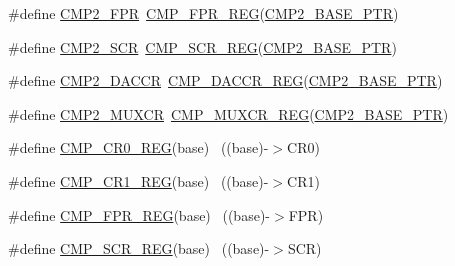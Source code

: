\begin{DoxyCompactItemize}
\item 
\#define \hyperlink{group___c_m_p___register___accessor___macros_ga9dc777b96070e089202af634a3da0feb}{C\+M\+P2\+\_\+\+F\+PR}~\hyperlink{group___c_m_p___register___accessor___macros_ga343773a1ef97ce5124a805a7e42af104}{C\+M\+P\+\_\+\+F\+P\+R\+\_\+\+R\+EG}(\hyperlink{group___c_m_p___peripheral_ga732cbf43f95d2d1cd01b4204263940ab}{C\+M\+P2\+\_\+\+B\+A\+S\+E\+\_\+\+P\+TR})
\item 
\#define \hyperlink{group___c_m_p___register___accessor___macros_ga3fecb254542d1ea6f149b0b42c31fc53}{C\+M\+P2\+\_\+\+S\+CR}~\hyperlink{group___c_m_p___register___accessor___macros_ga078b884bead12ed9b24c285c8f73fd27}{C\+M\+P\+\_\+\+S\+C\+R\+\_\+\+R\+EG}(\hyperlink{group___c_m_p___peripheral_ga732cbf43f95d2d1cd01b4204263940ab}{C\+M\+P2\+\_\+\+B\+A\+S\+E\+\_\+\+P\+TR})
\item 
\#define \hyperlink{group___c_m_p___register___accessor___macros_gac57bbed7635a10b34a5db2372b7a21ea}{C\+M\+P2\+\_\+\+D\+A\+C\+CR}~\hyperlink{group___c_m_p___register___accessor___macros_ga241a18e5c046627c53ba30229a1a313c}{C\+M\+P\+\_\+\+D\+A\+C\+C\+R\+\_\+\+R\+EG}(\hyperlink{group___c_m_p___peripheral_ga732cbf43f95d2d1cd01b4204263940ab}{C\+M\+P2\+\_\+\+B\+A\+S\+E\+\_\+\+P\+TR})
\item 
\#define \hyperlink{group___c_m_p___register___accessor___macros_gaefb6742f070600e76e40da89916a80e3}{C\+M\+P2\+\_\+\+M\+U\+X\+CR}~\hyperlink{group___c_m_p___register___accessor___macros_ga61de65bd4b7dc63f96d8c361be243a08}{C\+M\+P\+\_\+\+M\+U\+X\+C\+R\+\_\+\+R\+EG}(\hyperlink{group___c_m_p___peripheral_ga732cbf43f95d2d1cd01b4204263940ab}{C\+M\+P2\+\_\+\+B\+A\+S\+E\+\_\+\+P\+TR})
\item 
\#define \hyperlink{group___c_m_p___register___accessor___macros_gade821ad13c2c460c33f1c0929cc904c3}{C\+M\+P\+\_\+\+C\+R0\+\_\+\+R\+EG}(base)                                            ~((base)-\/$>$C\+R0)
\item 
\#define \hyperlink{group___c_m_p___register___accessor___macros_ga2f761d7412507e4415f230a5e4d972a2}{C\+M\+P\+\_\+\+C\+R1\+\_\+\+R\+EG}(base)                                            ~((base)-\/$>$C\+R1)
\item 
\#define \hyperlink{group___c_m_p___register___accessor___macros_ga343773a1ef97ce5124a805a7e42af104}{C\+M\+P\+\_\+\+F\+P\+R\+\_\+\+R\+EG}(base)                                            ~((base)-\/$>$F\+PR)
\item 
\#define \hyperlink{group___c_m_p___register___accessor___macros_ga078b884bead12ed9b24c285c8f73fd27}{C\+M\+P\+\_\+\+S\+C\+R\+\_\+\+R\+EG}(base)                                            ~((base)-\/$>$S\+CR)

\end{DoxyCompactItemize}
